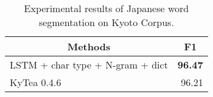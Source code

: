 \documentclass[11pt,letterpaper]{article}
\begin{document}
 
\begin{table}[t]
                                                                                                                                                                                                                                                                   
 \begin{center}                                                                                                                                                                                                                                                                                                             
\caption{Experimental results of Japanese word segmentation on Kyoto Corpus.}                                                                                                                                                                                                                                                                                 
\label{kc_result}                                                                                                                                                                                                                                                                                                              
 \begin{tabular}{p{60mm}| r }                                                                                                                                  
  \toprule                                                                                                                                                    
        \multicolumn{1}{c|}{Methods} & \multicolumn{1}{c}{F1}\ \\                                                                                             
        \midrule                                                                                                                                                                                                                                                                                                            
    LSTM + char type + N-gram + dict  & {\bf 96.47}\\  \hline                                                                                                                            
    KyTea 0.4.6 &  96.21\\ 
    \bottomrule                                                                                                                                               

\end{tabular}
\end{center}
\end{table}
\end{document}
